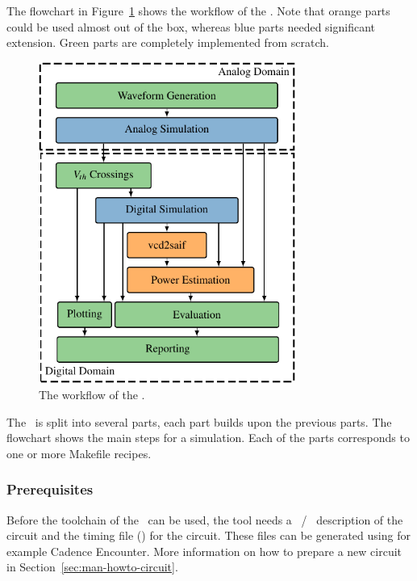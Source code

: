 The flowchart in Figure~\ref{fig:man-inv_tool_workflow} shows the workflow of 
the \invt. Note that orange parts could be used almost out of the 
box, whereas blue parts needed significant extension. Green parts are 
completely implemented from scratch.

\begin{figure}[!ht]
  \centering
  \includegraphics[width=0.75\textwidth]{figures/workflow.pdf}
  \caption{The workflow of the \invt.}
  \label{fig:man-inv_tool_workflow} %
\end{figure}

The \invt\ is split into several parts, each part builds upon
the previous parts. The flowchart shows the main steps for a simulation.
Each of the parts corresponds to one or more Makefile recipes.

\subsubsection{Prerequisites}
\label{sec:man-work-prerequisites}

Before the toolchain of the \invt\ can be used, the tool needs a \spice\ / 
\verilog\ description of the circuit and the timing file (\sdffile) for the 
circuit. These files can be generated using for example Cadence Encounter. More 
information on how to prepare a new circuit in 
Section~\ref{sec:man-howto-circuit}.

